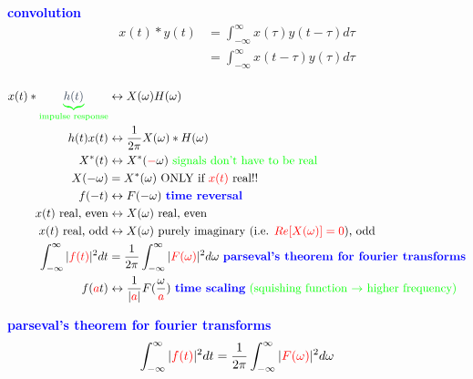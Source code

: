 \documentclass[a5paper, fleqn]{article}
\newcommand{\vocab}[1]{\textbf{\textcolor{blue}{#1}}}
\newcommand{\emf}[1]{\textcolor{red}{#1}}
\newcommand{\note}[1]{\textcolor{green}{#1}}
\newcommand{\eq}[1]{\textcolor{red}{$#1$}}
\newcommand{\under}[2]{\textcolor{green}{\underbrace{\textcolor{secondary}{#1}}_\text{#2}}}
\begin{document}
\vocab{convolution}
\begin{align*}
  x(t) * y(t)
   & = \int_{-\infty}^\infty x(\tau) y(t - \tau) d\tau \\
   & = \int_{-\infty}^\infty x(t - \tau) y(\tau) d\tau \\
\end{align*}

\begin{align*}
  x(t) * \under{h(t)}{impulse response}   & \leftrightarrow X(\omega) H(\omega)                                                                                                            \\
  h(t) x(t)                               & \leftrightarrow \frac{1}{2\pi} X(\omega) * H(\omega)                                                                                           \\
  X^*(t)                                  & \leftrightarrow X^*(\emf{-}\omega) ~ \note{\text{signals don't have to be real}}                                                               \\
  X(-\omega)                              & = X^*(\omega) ~ \text{ONLY if \eq{x(t)} real!!}                                                                                                \\
  f(-t)                                   & \leftrightarrow F(-\omega) ~ \vocab{time reversal}                                                                                             \\
  x(t)\text{ real, even}                  & \leftrightarrow X(\omega)\text{ real, even}                                                                                                    \\
  x(t)\text{ real, odd}                   & \leftrightarrow X(\omega)\text{ purely imaginary (i.e. \eq{Re[X(\omega)] = 0}), odd}                                                           \\
  \int_{-\infty}^\infty |\emf{f(t)}|^2 dt & = \frac{1}{2\pi} \int_{-\infty}^\infty |\emf{F(\omega)}|^2 d\omega ~ \vocab{parseval's theorem for fourier transforms}                         \\
  f(\emf{a}t)                             & \leftrightarrow \frac{1}{|\emf{a}|} F(\frac{\omega}{\emf{a}}) ~ \text{\vocab{time scaling} \note{(squishing function $\to$ higher frequency)}}
\end{align*}

\vocab{parseval's theorem for fourier transforms}
\[\int_{-\infty}^\infty |\emf{f(t)}|^2 dt = \frac{1}{2\pi} \int_{-\infty}^\infty |\emf{F(\omega)}|^2 d\omega\]
\end{document}
